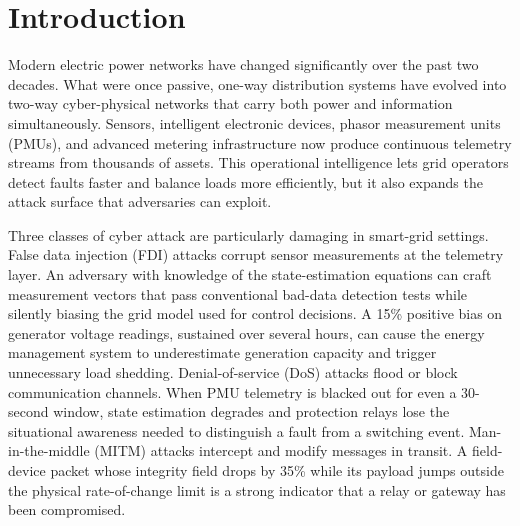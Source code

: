 
\section{Introduction}
\label{sec:intro}

Modern electric power networks have changed significantly over the past two decades. What were once
passive, one-way distribution systems have evolved into two-way cyber-physical networks that carry
both power and information simultaneously. Sensors, intelligent electronic devices, phasor
measurement units (PMUs), and advanced metering infrastructure now produce continuous telemetry
streams from thousands of assets. This operational intelligence lets grid operators detect faults
faster and balance loads more efficiently, but it also expands the attack surface that adversaries
can exploit.

Three classes of cyber attack are particularly damaging in smart-grid settings. False data injection
(FDI) attacks corrupt sensor measurements at the telemetry layer. An adversary with knowledge of
the state-estimation equations can craft measurement vectors that pass conventional bad-data
detection tests while silently biasing the grid model used for control decisions. A 15\% positive
bias on generator voltage readings, sustained over several hours, can cause the energy management
system to underestimate generation capacity and trigger unnecessary load shedding. Denial-of-service
(DoS) attacks flood or block communication channels. When PMU telemetry is blacked out for even a
30-second window, state estimation degrades and protection relays lose the situational awareness
needed to distinguish a fault from a switching event. Man-in-the-middle (MITM) attacks intercept
and modify messages in transit. A field-device packet whose integrity field drops by 35\% while its
payload jumps outside the physical rate-of-change limit is a strong indicator that a relay or
gateway has been compromised.

